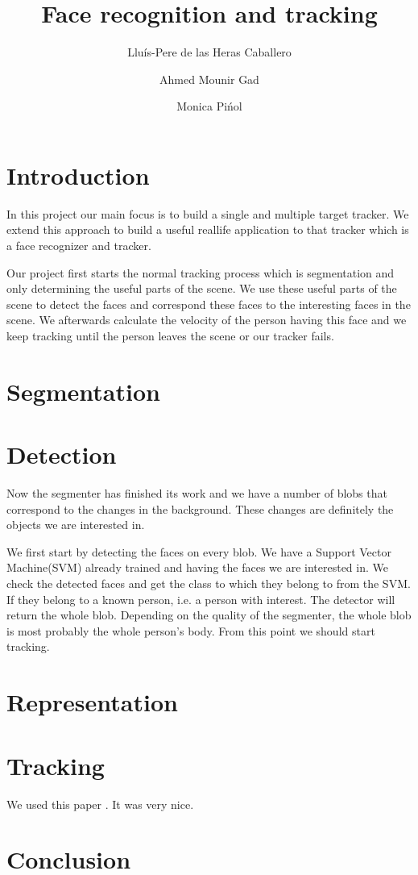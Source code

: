 \documentclass[12pt]{article}
\author{
	Llu\'{i}s-Pere de las Heras Caballero \and
	Ahmed Mounir Gad \and
	Monica Pi\'{n}ol
}
\title{Face recognition and tracking}
\begin{document}
\maketitle
\thispagestyle{empty}
\newpage

\section{Introduction}

In this project our main focus is to build a single and multiple target tracker. We extend this approach to build a useful reallife application to that tracker which is a face recognizer and tracker.

Our project first starts the normal tracking process which is segmentation and only determining the useful parts of the scene. We use these useful parts of the scene to detect the faces and correspond these faces to the interesting faces in the scene. We afterwards calculate the velocity of the person having this face and we keep tracking until the person leaves the scene or our tracker fails.

\section{Segmentation}

\section{Detection}

Now the segmenter has finished its work and we have a number of blobs that correspond to the changes in the background. These changes are definitely the objects we are interested in.

We first start by detecting the faces on every blob. We have a Support Vector Machine(SVM) already trained and having the faces we are interested in. We check the detected faces and get the class to which they belong to from the SVM. If they belong to a known person, i.e. a person with interest. The detector will return the whole blob. Depending on the quality of the segmenter, the whole blob is most probably the whole person's body. From this point we should start tracking.

\section{Representation}

\section{Tracking}

We used this paper \cite{Arulampalam01atutorial}. It was very nice.

\section{Conclusion}



\end{document}
